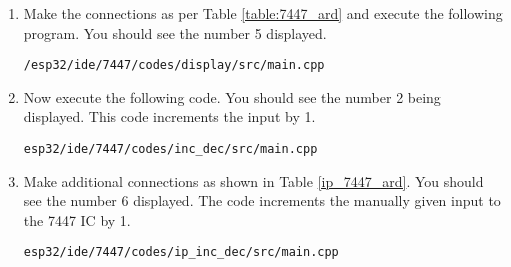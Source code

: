\begin{enumerate}
\item Make the connections as per Table \ref{table:7447_ard}  and execute the following program.  You should see the number 5 displayed.
\begin{lstlisting}
/esp32/ide/7447/codes/display/src/main.cpp
\end{lstlisting}
\begin{table}[H]
\centering

\caption{}
\label{table:7447_ard}
\end{table}
\item Now execute the following code.  You should see the number 2 being displayed.  This code increments the input by 1.
\begin{lstlisting}
esp32/ide/7447/codes/inc_dec/src/main.cpp
\end{lstlisting}
\item Make additional connections as shown in Table \ref{ip_7447_ard}. You should see the number 6 displayed. The code increments the manually given input to the 7447 IC by 1.
\begin{lstlisting}
esp32/ide/7447/codes/ip_inc_dec/src/main.cpp
\end{lstlisting}
\begin{table}[H]
\centering

\caption{}
\label{table:ip_7447_ard}
\end{table}
\end{enumerate}
